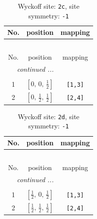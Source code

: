 \documentclass[fleqn,8pt]{jsarticle}
\begin{document}
\renewcommand{\arraystretch}{1.2}
\begin{longtable}{ccc}
\caption{Wyckoff site: {\tt 2c}, site symmetry: {\tt -1}}
 \\
 \hline \hline
No. & position & mapping \\ \hline \endfirsthead

\multicolumn{2}{l}{\tablename\ \thetable{}} \\
 \hline \hline
No. & position & mapping \\ \hline \endhead

 \hline \hline
\multicolumn{2}{r}{\footnotesize\it continued ...} \\ \endfoot

 \hline \hline
\multicolumn{2}{r}{} \\ \endlastfoot

1 & $\left[ 0,\, 0,\, \frac{1}{2} \right]$ & {\tt [1,3]} \\ \hline
2 & $\left[ 0,\, \frac{1}{2},\, \frac{1}{2} \right]$ & {\tt [2,4]} \\
\end{longtable}
\renewcommand{\arraystretch}{1.2}
\begin{longtable}{ccc}
\caption{Wyckoff site: {\tt 2d}, site symmetry: {\tt -1}}
 \\
 \hline \hline
No. & position & mapping \\ \hline \endfirsthead

\multicolumn{2}{l}{\tablename\ \thetable{}} \\
 \hline \hline
No. & position & mapping \\ \hline \endhead

 \hline \hline
\multicolumn{2}{r}{\footnotesize\it continued ...} \\ \endfoot

 \hline \hline
\multicolumn{2}{r}{} \\ \endlastfoot

1 & $\left[ \frac{1}{2},\, 0,\, \frac{1}{2} \right]$ & {\tt [1,3]} \\ \hline
2 & $\left[ \frac{1}{2},\, \frac{1}{2},\, \frac{1}{2} \right]$ & {\tt [2,4]} \\
\end{longtable}
\renewcommand{\arraystretch}{1.2}
\end{document}

